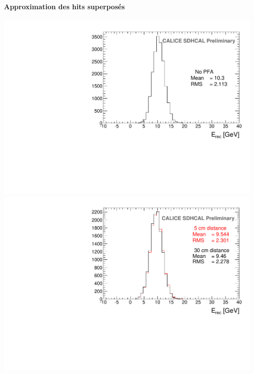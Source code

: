 \documentclass[8pt]{beamer}
\begin{document}
\begin{frame}
\begin{minipage}{0.44\linewidth}
\begin{center}
{        }
      \end{center}
    \end{minipage}
  \end{frame}
  
  
  \begin{frame}
  \frametitle{\secname}
  \framesubtitle{Approximation des hits superposés}
    \begin{center}
      \includegraphics[width=0.52\linewidth]{SingleParticle_10GeV.pdf}
      \includegraphics[width=0.52\linewidth]{OverlayEvent_OverlayCompare.pdf}
    \end{center}    
  \end{frame}
  
\end{document}
